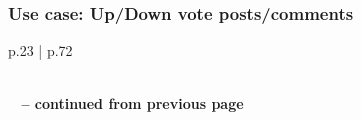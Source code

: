 \documentclass[11pt,a4paper]{report}
\begin{document}
\subsubsection{Use case: Up/Down vote posts/comments}

\begin{longtable}{p{} | p{}}
    \caption{Use case: Up/Down vote Posts/Comments} \label{tab:ucVotePosts} \\
    \endfirsthead
        {{\bfseries \tablename\ \thetable{} -- continued from previous page}} \\
         \\
    \endhead
         \\ 
    \endfoot
    \endlastfoot
    

\end{longtable}
\end{document}
